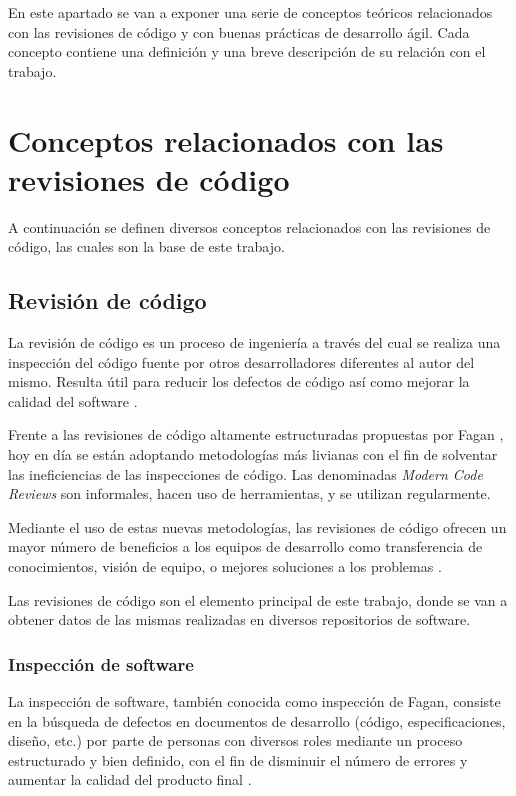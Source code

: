 
En este apartado se van a exponer una serie de conceptos teóricos relacionados con las revisiones de código y con buenas prácticas de desarrollo ágil. Cada concepto contiene una definición y una breve descripción de su relación con el trabajo.

\section{Conceptos relacionados con las revisiones de código}

A continuación se definen diversos conceptos relacionados con las revisiones de código, las cuales son la base de este trabajo.

\subsection{Revisión de código}
La revisión de código es un proceso de ingeniería a través del cual se realiza una inspección del código fuente por otros desarrolladores diferentes al autor del mismo. Resulta útil para reducir los defectos de código así como mejorar la calidad del software \cite{28121}.

Frente a las revisiones de código altamente estructuradas propuestas por Fagan \cite{5388086}, hoy en día se están adoptando metodologías más livianas con el fin de solventar las ineficiencias de las inspecciones de código. Las denominadas \emph{Modern Code Reviews} son informales, hacen uso de herramientas, y se utilizan regularmente.

Mediante el uso de estas nuevas metodologías, las revisiones de código ofrecen un mayor número de beneficios a los equipos de desarrollo como transferencia de conocimientos, visión de equipo, o mejores soluciones a los problemas \cite{Bacchelli:2013:EOC:2486788.2486882}.

Las revisiones de código son el elemento principal de este trabajo, donde se van a obtener datos de las mismas realizadas en diversos repositorios de software.

\subsubsection{Inspección de software}
La inspección de software, también conocida como inspección de Fagan, consiste en la búsqueda de defectos en documentos de desarrollo (código, especificaciones, diseño, etc.) por parte de personas con diversos roles mediante un proceso estructurado y bien definido, con el fin de disminuir el número de errores y aumentar la calidad del producto final \cite{5388086}.

